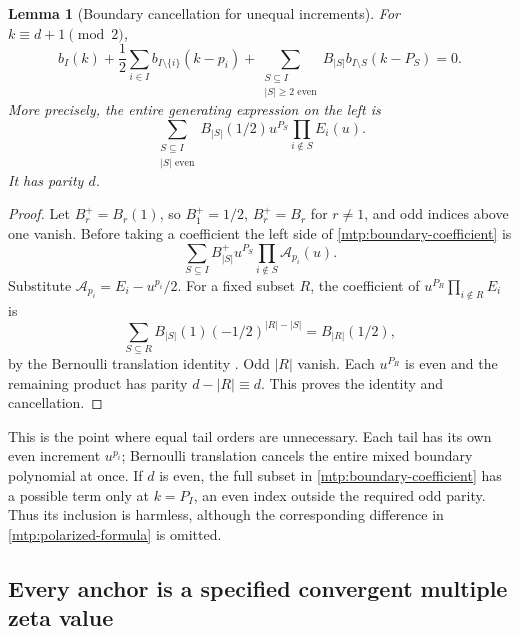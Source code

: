 \documentclass[11pt,letterpaper]{article}
\numberwithin{equation}{section}
\newtheorem{lemma}[theorem]{Lemma}
\theoremstyle{definition}
\theoremstyle{remark}
\begin{document}
\begin{lemma}[Boundary cancellation for unequal increments]
\label{mtp:boundary}
For $k\equiv d+1\pmod2$,
\begin{equation}\label{mtp:boundary-coefficient}
 b_I(k)+\frac12\sum_{i\in I}b_{I\setminus\{i\}}(k-p_i)
 +\sum_{\substack{S\subseteq I\\|S|\ge2\text{ even}}}
                    B_{|S|}b_{I\setminus S}(k-P_S)=0.
\end{equation}
More precisely, the entire generating expression on the left is
\begin{equation}\label{mtp:boundary-polynomial}
 \boxed{\sum_{\substack{S\subseteq I\\|S|\text{ even}}}
             B_{|S|}(1/2)u^{P_S}\prod_{i\notin S}E_i(u).}
\end{equation}
It has parity $d$.
\end{lemma}

\begin{proof}
Let $B_r^+=B_r(1)$, so $B_1^+=1/2$, $B_r^+=B_r$ for $r\ne1$,
and odd indices above one vanish. Before taking a coefficient the
left side of \eqref{mtp:boundary-coefficient} is
\[
                 \sum_{S\subseteq I}B_{|S|}^+u^{P_S}
                              \prod_{i\notin S}\mathcal A_{p_i}(u).
\]
Substitute $\mathcal A_{p_i}=E_i-u^{p_i}/2$. For a fixed subset $R$,
the coefficient of $u^{P_R}\prod_{i\notin R}E_i$ is
\[
 \sum_{S\subseteq R}B_{|S|}(1)(-1/2)^{|R|-|S|}
      =B_{|R|}(1/2),
\]
by the Bernoulli translation identity \cite[24.4.12]{DLMF}.
Odd $|R|$ vanish. Each $u^{P_R}$ is even and the remaining product
has parity $d-|R|\equiv d$. This proves the identity and cancellation.
\end{proof}

This is the point where equal tail orders are unnecessary. Each tail
has its own even increment $u^{p_i}$; Bernoulli translation cancels the
entire mixed boundary polynomial at once. If $d$ is even, the full
subset in \eqref{mtp:boundary-coefficient} has a possible term only at
$k=P_I$, an even index outside the required odd parity. Thus its
inclusion is harmless, although the corresponding difference in
\eqref{mtp:polarized-formula} is omitted.

\subsection{Every anchor is a specified convergent multiple zeta value}
\end{document}
